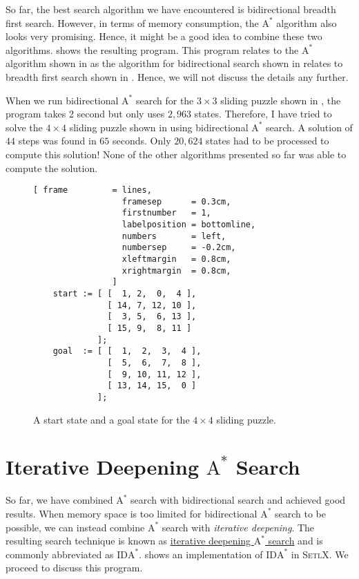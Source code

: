 So far, the best search algorithm we have encountered is bidirectional breadth first search.  However, in terms
of memory consumption, the $\mathrm{A}^*$ algorithm also looks very promising.  Hence, it might be a good idea
to combine these two algorithms.   shows the resulting program.  This program
relates to the $\mathrm{A}^*$ algorithm shown in  as the algorithm for bidirectional
search shown in  relates to breadth first search shown in .
Hence, we will not discuss the details any further.

When we run bidirectional $\mathrm{A}^*$ search for the $3 \times 3$ sliding puzzle shown in
, the program takes 2 second but only uses $2,963$ states.  Therefore, I have tried 
to solve the $4 \times 4$ sliding puzzle shown in  using
bidirectional $\mathrm{A}^*$ search.  A solution of $44$ steps was found in $65$ seconds.
Only $20,624$ states had to be processed to compute this solution!  None of the other algorithms presented so
far was able to compute the solution.

\begin{figure}[!ht]
\centering
\begin{Verbatim}[ frame         = lines, 
                  framesep      = 0.3cm, 
                  firstnumber   = 1,
                  labelposition = bottomline,
                  numbers       = left,
                  numbersep     = -0.2cm,
                  xleftmargin   = 0.8cm,
                  xrightmargin  = 0.8cm,
                ]
    start := [ [  1, 2,  0,  4 ],
               [ 14, 7, 12, 10 ],
               [  3, 5,  6, 13 ],
               [ 15, 9,  8, 11 ]
             ];
    goal  := [ [  1,  2,  3,  4 ],
               [  5,  6,  7,  8 ],
               [  9, 10, 11, 12 ],
               [ 13, 14, 15,  0 ]
             ];
\end{Verbatim}
\vspace*{-0.3cm}
\caption{A start state and a goal state for the $4 \times 4$ sliding puzzle.}
\label{fig:start-goal.stlx}
\end{figure}
\section{Iterative Deepening $\mathrm{A}^*$ Search}
So far, we have combined $\mathrm{A}^*$ search with bidirectional search and achieved good results.  When
memory space is too limited for bidirectional $\mathrm{A}^*$ search to be possible, we can instead
combine $\mathrm{A}^*$ search with \emph{iterative deepening}.  The resulting search technique is known as 
\href{https://en.wikipedia.org/wiki/Iterative_deepening_A*}{\color{blue}iterative deepening $\mathrm{A}^*$ search} 
and is commonly abbreviated as $\mathrm{IDA}^*$.   
shows an implementation of $\mathrm{IDA}^*$ in \textsc{SetlX}.  We proceed to discuss this program.

